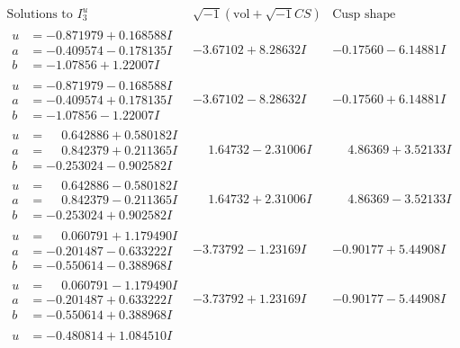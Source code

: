 \documentclass[1p]{elsarticle_modified}
\theoremstyle{definition}
\newcommand{\I}{\sqrt{-1}}
\begin{document}
$$\begin{array}{c|c|c}  
\text{Solutions to }I^u_{3}& \I (\text{vol} + \sqrt{-1}CS) & \text{Cusp shape}\\
 \hline 
\begin{aligned}
u &= -0.871979 + 0.168588 I \\
a &= -0.409574 - 0.178135 I \\
b &= -1.07856 + 1.22007 I\end{aligned}
 & -3.67102 + 8.28632 I & -0.17560 - 6.14881 I \\ \hline\begin{aligned}
u &= -0.871979 - 0.168588 I \\
a &= -0.409574 + 0.178135 I \\
b &= -1.07856 - 1.22007 I\end{aligned}
 & -3.67102 - 8.28632 I & -0.17560 + 6.14881 I \\ \hline\begin{aligned}
u &= \phantom{-}0.642886 + 0.580182 I \\
a &= \phantom{-}0.842379 + 0.211365 I \\
b &= -0.253024 - 0.902582 I\end{aligned}
 & \phantom{-}1.64732 - 2.31006 I & \phantom{-}4.86369 + 3.52133 I \\ \hline\begin{aligned}
u &= \phantom{-}0.642886 - 0.580182 I \\
a &= \phantom{-}0.842379 - 0.211365 I \\
b &= -0.253024 + 0.902582 I\end{aligned}
 & \phantom{-}1.64732 + 2.31006 I & \phantom{-}4.86369 - 3.52133 I \\ \hline\begin{aligned}
u &= \phantom{-}0.060791 + 1.179490 I \\
a &= -0.201487 - 0.633222 I \\
b &= -0.550614 - 0.388968 I\end{aligned}
 & -3.73792 - 1.23169 I & -0.90177 + 5.44908 I \\ \hline\begin{aligned}
u &= \phantom{-}0.060791 - 1.179490 I \\
a &= -0.201487 + 0.633222 I \\
b &= -0.550614 + 0.388968 I\end{aligned}
 & -3.73792 + 1.23169 I & -0.90177 - 5.44908 I \\ \hline\begin{aligned}
u &= -0.480814 + 1.084510 I \\

\end{aligned}
\end{array}$$
\end{document}
